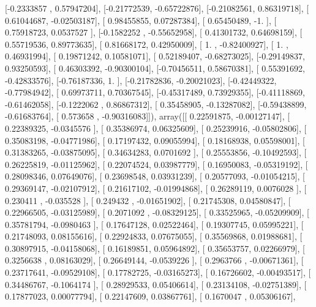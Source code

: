 \documentclass{article}
\begin{document}
       [-0.2333857 ,  0.57947204],
       [-0.21772539, -0.65722876],
       [-0.21082561,  0.86319718],
       [ 0.61044687, -0.02503187],
       [ 0.98455855,  0.07287384],
       [ 0.65450489, -1.        ],
       [ 0.75918723,  0.0537527 ],
       [-0.1582252 , -0.55652958],
       [ 0.41301732,  0.64698159],
       [ 0.55719536,  0.89773635],
       [ 0.81668172,  0.42950009],
       [ 1.        , -0.82400927],
       [ 1.        ,  0.46931994],
       [ 0.19871242,  0.10581071],
       [ 0.52189407, -0.68273025],
       [-0.29149837,  0.93250593],
       [ 0.46303392, -0.90300104],
       [-0.70456511,  0.58670381],
       [ 0.55391692, -0.42833576],
       [-0.76187336,  1.        ],
       [-0.21782836, -0.20021023],
       [-0.42449322, -0.77984942],
       [ 0.69973711,  0.70367545],
       [-0.45317489,  0.73929355],
       [-0.41118869, -0.61462058],
       [-0.1222062 ,  0.86867312],
       [ 0.35458905, -0.13287082],
       [-0.59438899, -0.61683764],
       [ 0.573658  , -0.90316083]]), array([[ 0.22591875, -0.00127147],
       [ 0.22389325, -0.0345576 ],
       [ 0.35386974,  0.06325609],
       [ 0.25239916, -0.05802806],
       [ 0.35083198, -0.04771986],
       [ 0.17197432,  0.09055994],
       [ 0.18168938,  0.05598001],
       [ 0.31383265, -0.03875095],
       [ 0.34634283,  0.0701692 ],
       [ 0.25553856, -0.10492593],
       [ 0.26225819, -0.01125962],
       [ 0.22074524,  0.03987779],
       [ 0.16950083, -0.05319192],
       [ 0.28098346,  0.07649076],
       [ 0.23698548,  0.03931239],
       [ 0.20577093, -0.01054215],
       [ 0.29369147, -0.02107912],
       [ 0.21617102, -0.01994868],
       [ 0.26289119,  0.0076028 ],
       [ 0.230411  , -0.035528  ],
       [ 0.249432  , -0.01651902],
       [ 0.21745308,  0.04580847],
       [ 0.22966505, -0.03125989],
       [ 0.2071092 , -0.08329125],
       [ 0.33525965, -0.05209909],
       [ 0.35781794, -0.0980463 ],
       [ 0.17647128,  0.02522464],
       [ 0.19307745,  0.05995221],
       [ 0.21748093,  0.08155616],
       [ 0.22924833,  0.07675055],
       [ 0.35569868,  0.01988681],
       [ 0.30897915, -0.04158068],
       [ 0.16189851,  0.05964892],
       [ 0.35653757,  0.02266979],
       [ 0.3256638 ,  0.08163029],
       [ 0.26649144, -0.0539226 ],
       [ 0.2963766 , -0.00671361],
       [ 0.23717641, -0.09529108],
       [ 0.17782725, -0.03165273],
       [ 0.16726602, -0.00493517],
       [ 0.34486767, -0.1064174 ],
       [ 0.28929533,  0.05406614],
       [ 0.23134108, -0.02751389],
       [ 0.17877023,  0.00077794],
       [ 0.22147609,  0.03867761],
       [ 0.1670047 ,  0.05306167],
\end{document}

